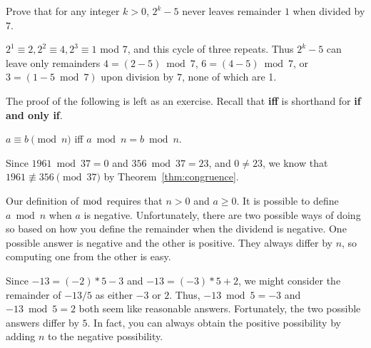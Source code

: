 %
\begin{exer} 
Prove that for any integer $k>0$, $2^k - 5$ never leaves remainder
$1$ when divided by $7$.
\vspace*{1in}
\begin{answer} $2^1 \equiv 2, 2^2
\equiv 4, 2^3 \equiv 1$ mod 7, and this cycle of three repeats.
Thus $2^k - 5$ can leave only remainders 
$4=(2-5)\bmod 7$, $6=(4-5)\bmod 7$, or $3=(1-5\bmod 7)$ upon
division by $7$, none of which are 1.
\end{answer}
\end{exer}

\noindent
The proof of the following is left as an exercise.
Recall that {\bf iff} is shorthand for {\bf if and only if}.
\begin{thm}\label{thm:congruence}
$a\equiv b\pmod n$ iff
$a\bmod n=b\bmod n$.
\end{thm}

\begin{exa}
Since $1961\bmod{37}=0$ and  $356\bmod{37}=23$, 
and $0\neq 23$, we know that $1961\not\equiv 356 \pmod{37}$
by Theorem~\ref{thm:congruence}.
\end{exa}


\begin{rem}
Our definition of $\bmod$ requires that $n>0$ and $a\geq 0$.
It is possible to define $a \bmod n$ when $a$ is negative.  
Unfortunately, there are two possible ways of doing so based on how you define the
remainder when the dividend is negative. One possible answer is negative and the other
is positive.   They always differ by $n$, so computing one from the other is easy.
\end{rem}
\begin{exa}
Since $-13 = (-2)*5 - 3$ and $-13 = (-3)*5 + 2$, we might consider the remainder of $-13/5$
as either $-3$ or $2$.  Thus,  $-13\bmod 5=-3$ and $-13\bmod 5 = 2$ both seem like reasonable answers.
Fortunately, the two possible answers differ by $5$.  
In fact, you can always obtain the positive possibility by adding $n$ to the negative possibility.
\end{exa}

